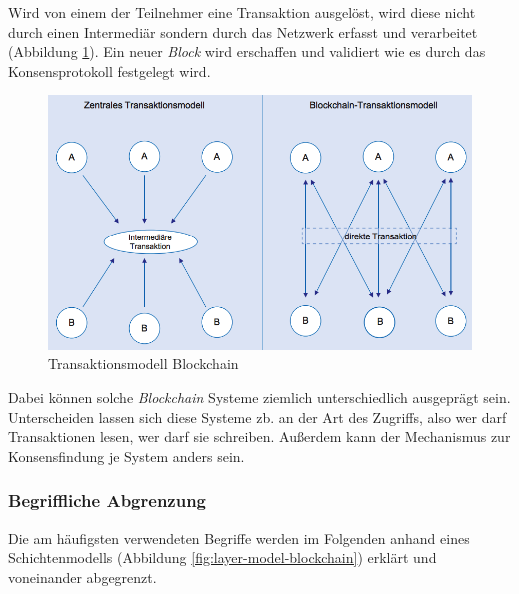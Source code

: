 Wird von einem der Teilnehmer eine Transaktion ausgelöst, wird diese nicht durch einen Intermediär sondern durch das Netzwerk erfasst und verarbeitet (Abbildung \ref{fig:change-in-transaction-model-blockchain}). Ein neuer \textit{Block} wird erschaffen und validiert wie es durch das Konsensprotokoll festgelegt wird.

\begin{figure}[h!]
	\centering
	\includegraphics[width=1.0\linewidth]{pictures/change-in-transaction-model-blockchain}
	\caption[Transaktionsmodell Blockchain]{Transaktionsmodell Blockchain}
	\label{fig:change-in-transaction-model-blockchain}
\end{figure}

Dabei können solche \textit{Blockchain} Systeme ziemlich unterschiedlich ausgeprägt sein. Unterscheiden lassen sich diese Systeme zb. an der Art des Zugriffs, also wer darf Transaktionen lesen, wer darf sie schreiben. Außerdem kann der Mechanismus zur Konsensfindung je System anders sein.





\subsubsection{Begriffliche Abgrenzung}

Die am häufigsten verwendeten Begriffe werden im Folgenden anhand eines Schichtenmodells (Abbildung \ref{fig:layer-model-blockchain}) erklärt und voneinander abgegrenzt.

